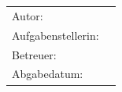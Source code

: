 \begin{titlepage}
  \centering


  \vspace{5mm}
  {\huge\MakeUppercase{\getFaculty{}}}\\

  \vspace{5mm}
  {\large\MakeUppercase{\getUniversity{}}}\\

  \vspace{20mm}
  {\Large \getDoctype{}}

  \makeatletter
  \vspace{15mm}
  {
  {\huge\bfseries \getTitle{}}

  \vspace{10mm}
  {\huge\bfseries \foreignlanguage{ngerman}{\getTitleGer{}}}
  }
  {
  {\huge\bfseries \getTitleGer{}}

  \vspace{10mm}
  {\huge\bfseries \foreignlanguage{english}{\getTitle{}}}
  }
  \makeatother

  \vspace{15mm}
  \begin{tabular}{l l}
    Autor:          		& \getAuthor{} \\
    Aufgabenstellerin:      & \getSupervisor{} \\
    Betreuer:         		& \getAdvisor{} \\
    Abgabedatum: 			& \getSubmissionDate{} \\
  \end{tabular}

\end{titlepage}
